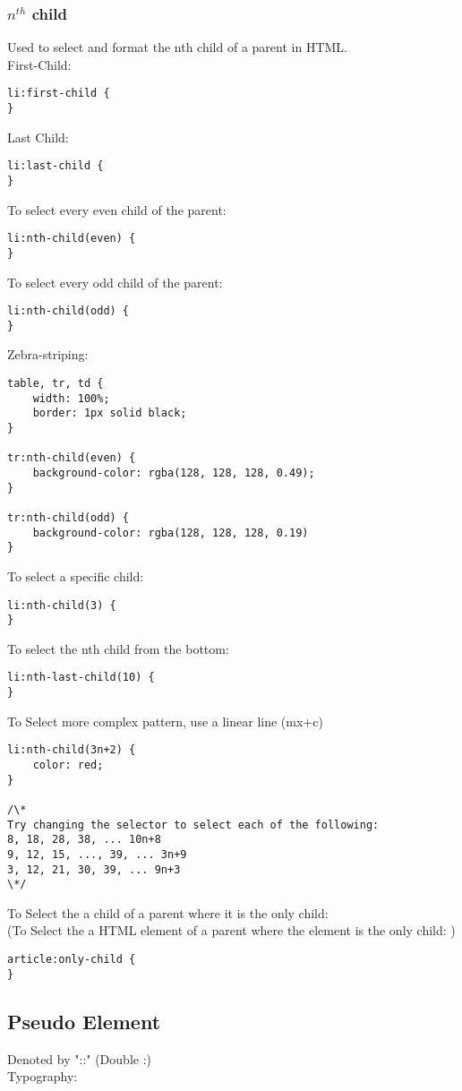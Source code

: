 \documentclass[]{article}
\newcommand{\<}{\guilsinglleft}
\renewcommand{\>}{\guilsinglright}
\begin{document}
\subsubsection{$n^{th}$ child}
Used to select and format the nth child of a parent in HTML.
\\
First-Child:
\begin{lstlisting}
li:first-child {
}
\end{lstlisting}
Last Child:
\begin{lstlisting}
li:last-child {
}
\end{lstlisting}
To select every even child of the parent:
\begin{lstlisting}
li:nth-child(even) {
}
\end{lstlisting}
To select every odd child of the parent:
\begin{lstlisting}
li:nth-child(odd) {
}
\end{lstlisting}
Zebra-striping:
\begin{lstlisting}
table, tr, td {
	width: 100%;
	border: 1px solid black;
}

tr:nth-child(even) {
	background-color: rgba(128, 128, 128, 0.49);
}

tr:nth-child(odd) {
	background-color: rgba(128, 128, 128, 0.19)
}
\end{lstlisting}
To select a specific child:
\begin{lstlisting}
li:nth-child(3) {
}
\end{lstlisting}
To select the nth child from the bottom:
\begin{lstlisting}
li:nth-last-child(10) {
}
\end{lstlisting}
To Select more complex pattern, use a linear line (mx+c)
\begin{lstlisting}
li:nth-child(3n+2) {
	color: red;
}

/\*
Try changing the selector to select each of the following:
8, 18, 28, 38, ... 10n+8
9, 12, 15, ..., 39, ... 3n+9
3, 12, 21, 30, 39, ... 9n+3
\*/
\end{lstlisting}
To Select the a child of a parent where it is the only child: 
\\
(To Select the a HTML element of a parent where the element is the only child: )
\begin{lstlisting}
article:only-child {
}
\end{lstlisting}

\subsection{Pseudo Element}
Denoted by "::" (Double :)
\\
Typography:
\end{document}

